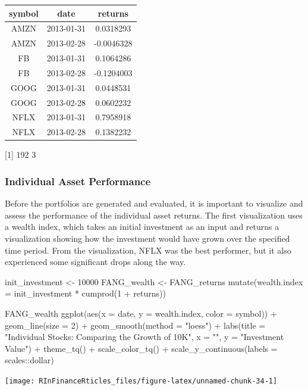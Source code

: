 \begin{tabular}{ccc}
\toprule
symbol & date & returns\\
\midrule
AMZN & 2013-01-31 & 0.0318293\\
AMZN & 2013-02-28 & -0.0046328\\
FB & 2013-01-31 & 0.1064286\\
FB & 2013-02-28 & -0.1204003\\
GOOG & 2013-01-31 & 0.0448531\\
\addlinespace
GOOG & 2013-02-28 & 0.0602232\\
NFLX & 2013-01-31 & 0.7958918\\
NFLX & 2013-02-28 & 0.1382232\\
\bottomrule
\end{tabular}

{[}1{]} 192 3

\hspace{20 mm}

\subsubsection{Individual Asset
Performance}\label{individual-asset-performance}

Before the portfolios are generated and evaluated, it is important to
visualize and assess the performance of the individual asset returns.
The first visualization uses a wealth index, which takes an initial
investment as an input and returns a visualization showing how the
investment would have grown over the specified time period. From the
visualization, NFLX was the best performer, but it also experienced some
significant drops along the way.

\begin{Schunk}
\begin{Sinput}
init_investment <- 10000
FANG_wealth <- FANG_returns %
    mutate(wealth.index = init_investment * cumprod(1 + returns))

FANG_wealth %
    ggplot(aes(x = date, y = wealth.index, color = symbol)) +
    geom_line(size = 2) +
    geom_smooth(method = "loess") +
    labs(title = "Individual Stocks: Comparing the Growth of 10K",
         x = "", y = "Investment Value") +
    theme_tq() +
    scale_color_tq() +
    scale_y_continuous(labels = scales::dollar)
\end{Sinput}


\begin{center}\texttt{[image: RInFinanceRticles\_files/figure-latex/unnamed-chunk-34-1]} \end{center}

\end{Schunk}

